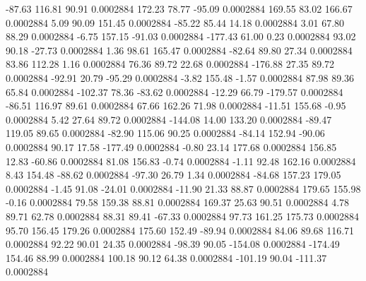       -87.63      116.81       90.91     0.0002884
      172.23       78.77      -95.09     0.0002884
      169.55       83.02      166.67     0.0002884
        5.09       90.09      151.45     0.0002884
      -85.22       85.44       14.18     0.0002884
        3.01       67.80       88.29     0.0002884
       -6.75      157.15      -91.03     0.0002884
     -177.43       61.00        0.23     0.0002884
       93.02       90.18      -27.73     0.0002884
        1.36       98.61      165.47     0.0002884
      -82.64       89.80       27.34     0.0002884
       83.86      112.28        1.16     0.0002884
       76.36       89.72       22.68     0.0002884
     -176.88       27.35       89.72     0.0002884
      -92.91       20.79      -95.29     0.0002884
       -3.82      155.48       -1.57     0.0002884
       87.98       89.36       65.84     0.0002884
     -102.37       78.36      -83.62     0.0002884
      -12.29       66.79     -179.57     0.0002884
      -86.51      116.97       89.61     0.0002884
       67.66      162.26       71.98     0.0002884
      -11.51      155.68       -0.95     0.0002884
        5.42       27.64       89.72     0.0002884
     -144.08       14.00      133.20     0.0002884
      -89.47      119.05       89.65     0.0002884
      -82.90      115.06       90.25     0.0002884
      -84.14      152.94      -90.06     0.0002884
       90.17       17.58     -177.49     0.0002884
       -0.80       23.14      177.68     0.0002884
      156.85       12.83      -60.86     0.0002884
       81.08      156.83       -0.74     0.0002884
       -1.11       92.48      162.16     0.0002884
        8.43      154.48      -88.62     0.0002884
      -97.30       26.79        1.34     0.0002884
      -84.68      157.23      179.05     0.0002884
       -1.45       91.08      -24.01     0.0002884
      -11.90       21.33       88.87     0.0002884
      179.65      155.98       -0.16     0.0002884
       79.58      159.38       88.81     0.0002884
      169.37       25.63       90.51     0.0002884
        4.78       89.71       62.78     0.0002884
       88.31       89.41      -67.33     0.0002884
       97.73      161.25      175.73     0.0002884
       95.70      156.45      179.26     0.0002884
      175.60      152.49      -89.94     0.0002884
       84.06       89.68      116.71     0.0002884
       92.22       90.01       24.35     0.0002884
      -98.39       90.05     -154.08     0.0002884
     -174.49      154.46       88.99     0.0002884
      100.18       90.12       64.38     0.0002884
     -101.19       90.04     -111.37     0.0002884
